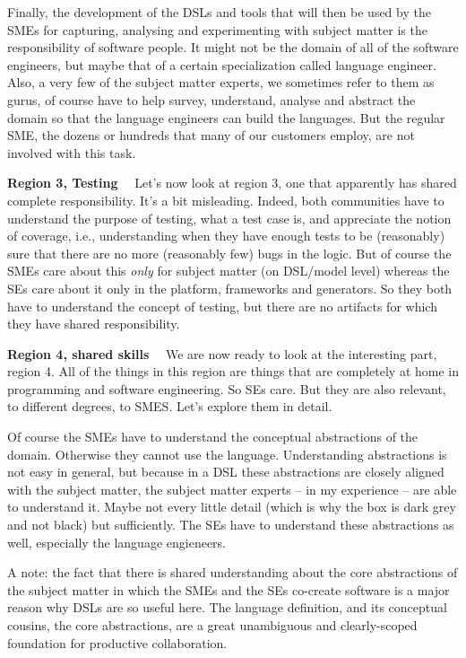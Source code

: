 \documentclass[runningheads]{llncs}
\newcommand\parhead[1]{\vspace{1mm}\noindent\textbf{{#1}}\ \ }
\begin{document}
Finally, the development of the DSLs and tools that will then be used
by the SMEs for capturing, analysing and experimenting with subject matter
is the responsibility of software people. It might not be the domain of
all of the software engineers, but maybe that of a certain specialization
called language engineer. Also, a very few of the subject matter experts,
we sometimes refer to them as gurus, of course have to help survey,
understand, analyse and abstract the domain so that the language engineers
can build the languages. But the regular SME, the dozens or hundreds
that many of our customers employ, are not involved with this task.

\parhead{Region 3, Testing} Let's now look at region 3, one that apparently has
shared complete responsibility. It's a bit misleading. Indeed, both communities
have to understand the purpose of testing, what a test case is, and appreciate
the notion of coverage, i.e., understanding when they have enough tests to be
(reasonably) sure that there are no more (reasonably few) bugs in the logic. But
of course the SMEs care about this \emph{only} for subject matter (on DSL/model
level) whereas the SEs care about it only in the platform, frameworks and
generators. So they both have to understand the concept of testing, but there
are no artifacts for which they have shared responsibility.

\parhead{Region 4, shared skills} We are now ready to look at the interesting
part, region 4. All of the things in this region are things that are completely
at home in programming and software engineering. So SEs care. But they are also
relevant, to different degrees, to SMES. Let's explore them in detail.

Of course the SMEs have to understand the conceptual abstractions of the domain.
Otherwise they cannot use the language.
Understanding abstractions is not easy in general, but because in a DSL these
abstractions are closely aligned with the subject matter, the subject matter
experts -- in my experience -- are able to understand it. Maybe not every little
detail (which is why the box is dark grey and not black) but sufficiently. The
SEs have to understand these abstractions as well, especially the language
engieneers. 

A note: the fact that there is shared understanding about the core abstractions
of the subject matter in which the SMEs and the SEs co-create software is a major
reason why DSLs are so useful here. The language definition, and its conceptual
cousins, the core abstractions, are a great unambiguous and clearly-scoped
foundation for productive collaboration.
\end{document}

